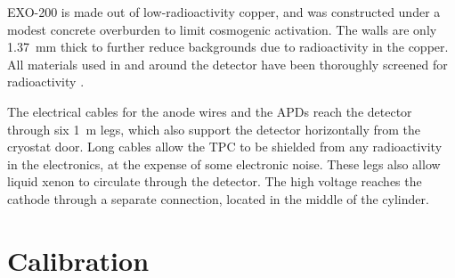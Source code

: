 \documentclass[herrin-thesis.tex]{subfiles}
\begin{document}
EXO-200 is made out of low-radioactivity copper, and was constructed under a modest concrete overburden to limit cosmogenic activation. The walls are only \SI{1.37}{\mm} thick to further reduce backgrounds due to radioactivity in the copper. All materials used in and around the detector have been thoroughly screened for radioactivity \cite{Leonard:2008uq}.

The electrical cables for the anode wires and the APDs reach the detector through six \about{}\SI{1}{\m} legs, which also support the detector horizontally from the cryostat door. Long cables allow the TPC to be shielded from any radioactivity in the electronics, at the expense of some electronic noise. These legs also allow liquid xenon to circulate through the detector. The high voltage reaches the cathode through a separate connection, located in the middle of the cylinder.

\section{Calibration}
\label{sec:detector_calibration}
\end{document}
